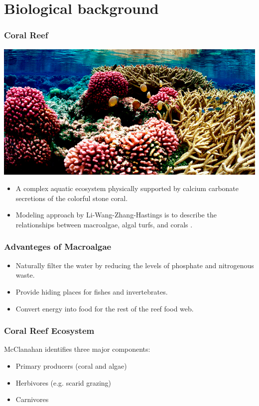 
\section{Biological background}

\begin{frame}
\frametitle{Coral Reef}
\includegraphics[scale=.175]{./US-Wildlife-coral-1.jpg}
\begin{itemize}
\item A complex aquatic ecosystem physically supported by calcium carbonate secretions of the colorful stone coral.
\item Modeling approach by Li-Wang-Zhang-Hastings is to describe the relationships between macroalgae, algal turfs, and corals \cite{Hastings}.
\end{itemize}
\end{frame}

\begin{frame}
\frametitle{Advanteges of Macroalgae}
\begin{itemize}
\item Naturally filter the water by reducing the levels of phosphate and nitrogenous waste.
\item Provide hiding places for fishes and invertebrates.
\item Convert energy into food for the rest of the reef food web.
\end{itemize}
\end{frame}

\begin{frame}
\frametitle{Coral Reef Ecosystem} 

McClanahan identifies three major components\cite{McClanahan}:
\begin{itemize}
\item Primary producers (coral and algae)\\
\item Herbivores (e.g. scarid grazing)\\
\item Carnivores
\end{itemize}
\end{frame}

